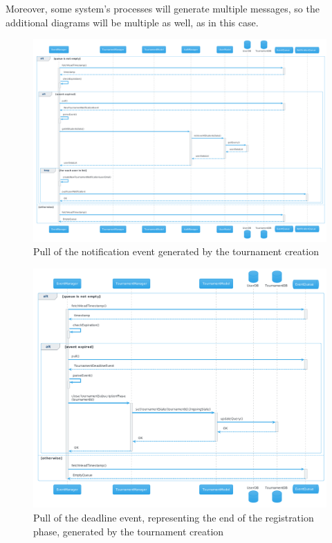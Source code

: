Moreover, some system's processes will generate multiple messages, so the additional diagrams will be multiple as well, as in this case.
\begin{figure}[H]
    \hspace{-0.7cm}
    \includegraphics[width=1.1\textwidth]{Diagrams/sequence/create_tournament_pull_notification.png}
    \caption{Pull of the notification event generated by the tournament creation}
\end{figure}
\begin{figure}[H]
    \hspace{-0.7cm}
    \includegraphics[width=1.1\textwidth]{Diagrams/sequence/create_tournament_pull_deadline.png}
    \caption{Pull of the deadline event, representing the end of the registration phase, generated by the tournament creation}
\end{figure}

